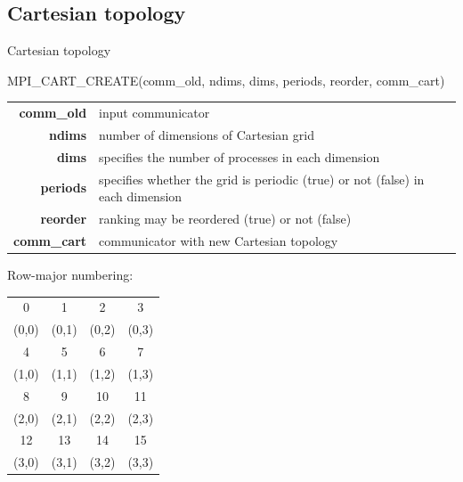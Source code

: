 \documentclass[aspectratio=43]{beamer}
\begin{document}
\subsection{Cartesian topology}
\begin{frame}[fragile]{Cartesian topology}
\begin{Fortranlisting}[]{}
MPI_CART_CREATE(comm_old, ndims, dims, periods, reorder, comm_cart)
\end{Fortranlisting}
\begin{black1block}{}
\begin{tabular}{rp{8cm}}
\textbf{comm\_old} & input communicator\\
\textbf{ndims} & number of dimensions of Cartesian grid\\
\textbf{dims} & specifies the number of processes in each dimension\\
\textbf{periods} & specifies whether the grid is periodic (true) or not (false) in each dimension\\
\textbf{reorder} & ranking may be reordered (true) or not (false)\\
\textbf{comm\_cart} & communicator with new Cartesian topology\\
\end{tabular}
\end{black1block}
\vspace{-0.3cm}
\begin{center}
Row-major numbering:\hspace{0.5cm}
\footnotesize
\begin{tabular}{|c|c|c|c|}
\hline
\color{cscsblue}0  & \color{cscsblue}1  & \color{cscsblue}2  & \color{cscsblue}3\\
    (0,0) & (0,1) & (0,2) & (0,3)\\\hline
\color{cscsblue}4  & \color{cscsblue}5  & \color{cscsblue}6  & \color{cscsblue}7\\
    (1,0) & (1,1) & (1,2) & (1,3)\\\hline
\color{cscsblue}8  & \color{cscsblue}9  & \color{cscsblue}10 & \color{cscsblue}11\\
    (2,0) & (2,1) & (2,2) & (2,3)\\\hline
\color{cscsblue}12 & \color{cscsblue}13 & \color{cscsblue}14 & \color{cscsblue}15\\
    (3,0) & (3,1) & (3,2) & (3,3)\\\hline
\end{tabular}
\end{center}
\end{frame}
\end{document}
